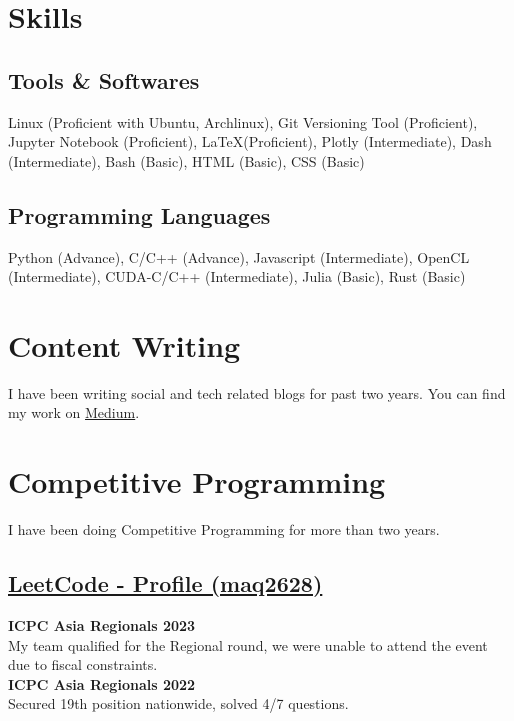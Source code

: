 \documentclass[]{resume}
\begin{document}
\hfill
\begin{minipage}[t]{0.5\textwidth}


    \section{Skills}

    \subsection{Tools \& Softwares}
    Linux (Proficient with Ubuntu, Archlinux),
    Git Versioning Tool (Proficient),
    Jupyter Notebook (Proficient),
    \LaTeX (Proficient),
    Plotly (Intermediate),
    Dash (Intermediate), Bash (Basic),
    HTML (Basic), CSS (Basic)\\

    \subsection{Programming Languages}
	Python (Advance), C/C++ (Advance), Javascript (Intermediate), OpenCL (Intermediate), CUDA-C/C++ (Intermediate), Julia (Basic), Rust (Basic)


    \section{Content Writing}
    I have been writing social and tech related blogs for past two years. You can find my work on \href{https://medium.com/@mesumali26-ma}{Medium}.

    \section{Competitive Programming}
    I have been doing Competitive Programming for more than two years.\\
    \subsection{\href{https://leetcode.com/maq2628/}{\textbf{LeetCode - Profile (maq2628)}}}
    \textbf{ICPC Asia Regionals 2023}\\
    My team qualified for the Regional round, we were unable to attend the event due to fiscal constraints.\\
    \textbf{ICPC Asia Regionals 2022}\\
    Secured 19th position nationwide, solved 4/7 questions.


\end{minipage}
\end{document}
